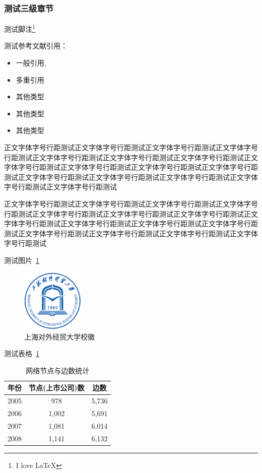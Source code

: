 \documentclass{SUIBEthesis}
\begin{document}
\subsubsection{测试三级章节}

测试脚注\footnote{I love \LaTeX}

测试参考文献引用：

\begin{itemize}
\item 一般引用\cite{lamport1994latex},\cite{马丽莎2014交叉持股关系影响股价联动吗}
\item 多重引用\cite{lamport1994latex, knuth1984texbook}
\item 其他类型\cite[see][]{knuth1984texbook}
\item 其他类型\cite[section2]{knuth1984texbook}
\item 其他类型\cite[see][]{knuth1984texbook, lamport1994latex, 马丽莎2014交叉持股关系影响股价联动吗}
\end{itemize}


正文字体字号行距测试正文字体字号行距测试正文字体字号行距测试正文字体字号行距测试正文字体字号行距测试正文字体字号行距测试正文字体字号行距测试正文字体字号行距测试正文字体字号行距测试正文字体字号行距测试正文字体字号行距测试正文字体字号行距测试正文字体字号行距测试正文字体字号行距测试正文字体字号行距测试正文字体字号行距测试

正文字体字号行距测试正文字体字号行距测试正文字体字号行距测试正文字体字号行距测试正文字体字号行距测试正文字体字号行距测试正文字体字号行距测试正文字体字号行距测试正文字体字号行距测试正文字体字号行距测试正文字体字号行距测试正文字体字号行距测试正文字体字号行距测试正文字体字号行距测试正文字体字号行距测试


测试图片~\ref{fig:1} 

\begin{figure}[htbp!]
  \centering
  \includegraphics[height=3cm]{data/figure/logo.pdf}
  \caption{上海对外经贸大学校徽}
  \label{fig:1}
\end{figure}


测试表格~\ref{tab:1}

\begin{table}[htbp]
  \centering
  \caption{网络节点与边数统计}
  \begin{tabular}{ccc}
    \toprule
    \toprule
    年份    & 节点(上市公司)数   & 边数 \\
    \midrule
    2005  & 978   & 5,736 \\
    2006  & 1,002 & 5,691 \\
    2007  & 1,081 & 6,014 \\
    2008  & 1,141 & 6,132 \\
    \bottomrule
    \bottomrule
  \end{tabular}%
  \label{tab:1}%
\end{table}%
\end{document}
